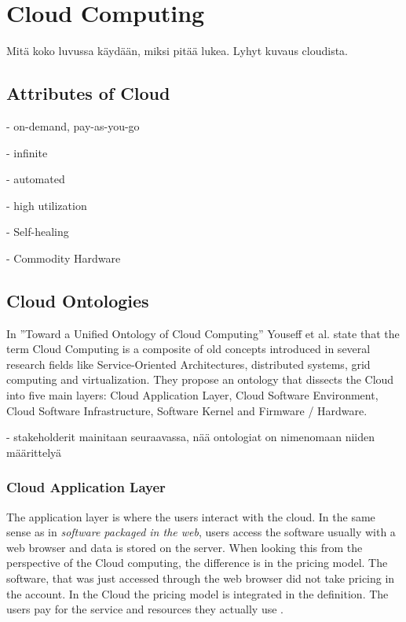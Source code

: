 \documentclass{tktltiki}
\begin{document}
\section{Cloud Computing}

Mitä koko luvussa käydään, miksi pitää lukea.  Lyhyt kuvaus cloudista.


\subsection{Attributes of Cloud}

- on-demand, pay-as-you-go

- infinite

- automated

- high utilization

- Self-healing

- Commodity Hardware


\subsection{Cloud Ontologies}

In ''Toward a Unified Ontology of Cloud Computing'' Youseff et al. \cite{unified_ontology} state that the term Cloud Computing is a composite of old concepts introduced in several research fields like Service-Oriented Architectures, distributed systems, grid computing and virtualization.  They propose an ontology that dissects the Cloud into five main layers: Cloud Application Layer, Cloud Software Environment, Cloud Software Infrastructure, Software Kernel and Firmware / Hardware.  

- stakeholderit mainitaan seuraavassa, nää ontologiat on nimenomaan niiden määrittelyä


\subsubsection{Cloud Application Layer}

The application layer is where the users interact with the cloud.  In the same sense as in \emph{software packaged in the web}, users access the software usually with a web browser and data is stored on the server.  When looking this from the perspective of the Cloud computing, the difference is in the pricing model.  The software, that was just accessed through the web browser did not take pricing in the account.  In the Cloud the pricing model is integrated in the definition.  The users pay for the service and resources they actually use \cite{Cusumano10}. 
\end{document}
